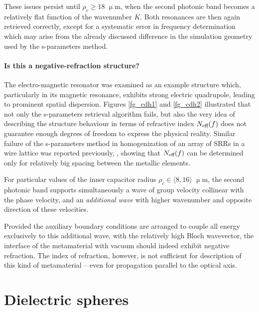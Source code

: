 These issues persist until $\rho_c \geq 18$ $\upmu$m, when the second photonic band becomes a relatively flat function of the wavenumber $K$. Both resonances are then again retrieved correctly, except for a systematic error in frequency determination which may arise from the already discussed difference in the simulation geometry used by the s-parameters method.

\paragraph{Is this a negative-refraction structure?}%
The electro-magnetic resonator was examined as an example structure which, particularly in its magnetic resonance, exhibits strong electric quadrupole, leading to prominent spatial dispersion. Figures \ref{fg_cdh1} and \ref{fg_cdh2} illustrated that not only the s-parameters retrieval algorithm fails, but also the very idea of describing the structure behaviour in terms of refractive index $N_{\text{eff} }(f)$ does not guarantee enough degrees of freedom to express the physical reality.
Similar failure of the s-parameters method in homogenization of an array of SRRs in a wire lattice was reported previously, \cite{rockstuhl2008transition}, showing that $N_{\text{eff} }(f)$ can be determined only for relatively big spacing between the metallic  elements.

For particular values of the inner capacitor radius $\rho_c \in \langle8,16\rangle$ $\upmu$m, the second photonic band supports simultaneously a wave of group velocity collinear with the phase velocity, and an \textit{additional wave} with higher wavenumber and opposite direction of these velocities. 

Provided the auxiliary boundary conditions are arranged to couple all energy exclusively to this additional wave, with the relatively high Bloch wavevector, the interface of the metamaterial with vacuum should indeed exhibit negative refraction. The index of refraction, however, is not sufficient for description of this kind of metamaterial -- even for propagation parallel to the optical axis.



\FloatBarrier %
\section{Dielectric spheres} %

